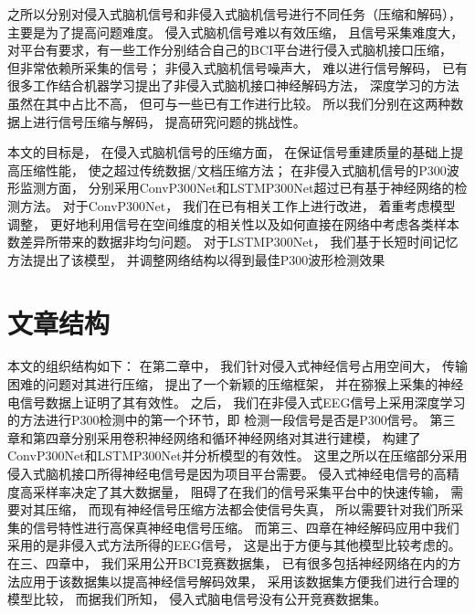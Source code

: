 之所以分别对侵入式脑机信号和非侵入式脑机信号进行不同任务（压缩和解码）， 主要是为了提高问题难度。 侵入式脑机信号难以有效压缩， 且信号采集难度大，对平台有要求，有一些工作分别结合自己的BCI平台进行侵入式脑机接口压缩， 但非常依赖所采集的信号；  非侵入式脑机信号噪声大， 难以进行信号解码， 已有很多工作结合机器学习提出了非侵入式脑机接口神经解码方法， 深度学习的方法虽然在其中占比不高， 但可与一些已有工作进行比较。 所以我们分别在这两种数据上进行信号压缩与解码， 提高研究问题的挑战性。 


本文的目标是， 在侵入式脑机信号的压缩方面， 在保证信号重建质量的基础上提高压缩性能， 使之超过传统数据/文档压缩方法； 在非侵入式脑机信号的P300波形监测方面， 分别采用ConvP300Net和LSTMP300Net超过已有基于神经网络的检测方法。  对于ConvP300Net， 我们在已有相关工作上进行改进， 着重考虑模型调整， 更好地利用信号在空间维度的相关性以及如何直接在网络中考虑各类样本数差异所带来的数据非均匀问题。 对于LSTMP300Net， 我们基于长短时间记忆方法提出了该模型， 并调整网络结构以得到最佳P300波形检测效果



\section{文章结构}

本文的组织结构如下： 在第二章中， 我们针对侵入式神经信号占用空间大， 传输困难的问题对其进行压缩， 提出了一个新颖的压缩框架， 并在猕猴上采集的神经电信号数据上证明了其有效性。 之后， 我们在非侵入式EEG信号上采用深度学习的方法进行P300检测中的第一个环节，即 检测一段信号是否是P300信号。 第三章和第四章分别采用卷积神经网络和循环神经网络对其进行建模， 构建了ConvP300Net和LSTMP300Net并分析模型的有效性。 这里之所以在压缩部分采用侵入式脑机接口所得神经电信号是因为项目平台需要。 侵入式神经电信号的高精度高采样率决定了其大数据量， 阻碍了在我们的信号采集平台中的快速传输， 需要对其压缩， 而现有神经信号压缩方法都会使信号失真， 所以需要针对我们所采集的信号特性进行高保真神经电信号压缩。 而第三、四章在神经解码应用中我们采用的是非侵入式方法所得的EEG信号， 这是出于方便与其他模型比较考虑的。 在三、四章中， 我们采用公开BCI竞赛数据集\cite{blankertz2006bci}， 已有很多包括神经网络在内的方法应用于该数据集以提高神经信号解码效果， 采用该数据集方便我们进行合理的模型比较， 而据我们所知， 侵入式脑电信号没有公开竞赛数据集。









